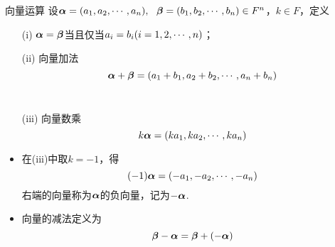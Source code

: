 \begin{frame}
  \begin{footnotesize}
    \begin{block}{向量运算}
      设$\boldsymbol{\alpha}=(a_1,a_2,\cdots,a_n),~~\boldsymbol{\beta}=(b_1,b_2,\cdots,b_n)\in F^n$，$k\in F$，定义
      \begin{itemize}
      \item[(i)]
        $\boldsymbol{\alpha}=\boldsymbol{\beta}$当且仅当$a_i=b_i(i=1,2,\cdots,n)$；\\[0.1in]
      \item[(ii)]向量加法
        $$
        \boldsymbol{\alpha}+\boldsymbol{\beta}=(a_1+b_1,a_2+b_2,\cdots,a_n+b_n)
        $$\\[0.1in]
      \item[(iii)]向量数乘
        $$
        k\boldsymbol{\alpha}=(ka_1,ka_2,\cdots,ka_n)
        $$
      \end{itemize}
    \end{block}
    \pause
    
    \begin{itemize}
    \item 在(iii)中取$k=-1$，得
      $$
      (-1)\boldsymbol{\alpha} = (-a_1,-a_2,\cdots,-a_n)
      $$
      右端的向量称为$\boldsymbol{\alpha}$的负向量，记为$-\boldsymbol{\alpha}$. \\[0.1in]
    \item 向量的减法定义为
      $$
      \boldsymbol{\beta}-\boldsymbol{\alpha} = \boldsymbol{\beta} + (-\boldsymbol{\alpha})
      $$
    \end{itemize}
    
  \end{footnotesize}
\end{frame}


